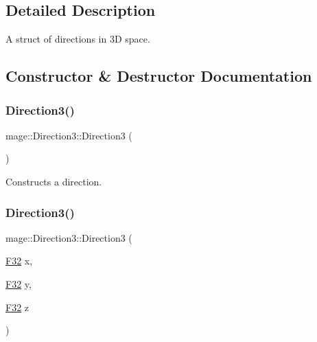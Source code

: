 \subsection{Detailed Description}
A struct of directions in 3D space. 

\subsection{Constructor \& Destructor Documentation}
\hypertarget{structmage_1_1_direction3_a1c3d06aa13b207f86df36f5f3cfe486a}{}\label{structmage_1_1_direction3_a1c3d06aa13b207f86df36f5f3cfe486a} 
\subsubsection{\texorpdfstring{Direction3()}{Direction3()}\hspace{0.1cm}{\footnotesize\ttfamily [1/8]}}
{\footnotesize\ttfamily mage\+::\+Direction3\+::\+Direction3 (\begin{DoxyParamCaption}{ }\end{DoxyParamCaption})\hspace{0.3cm}{\ttfamily [noexcept]}}

Constructs a direction. \hypertarget{structmage_1_1_direction3_a1dbabfdd974f0c2e492ae3c291bdc479}{}\label{structmage_1_1_direction3_a1dbabfdd974f0c2e492ae3c291bdc479} 
\subsubsection{\texorpdfstring{Direction3()}{Direction3()}\hspace{0.1cm}{\footnotesize\ttfamily [2/8]}}
{\footnotesize\ttfamily mage\+::\+Direction3\+::\+Direction3 (\begin{DoxyParamCaption}\item[{\hyperlink{namespacemage_aa97e833b45f06d60a0a9c4fc22ae02c0}{F32}}]{x,  }\item[{\hyperlink{namespacemage_aa97e833b45f06d60a0a9c4fc22ae02c0}{F32}}]{y,  }\item[{\hyperlink{namespacemage_aa97e833b45f06d60a0a9c4fc22ae02c0}{F32}}]{z }\end{DoxyParamCaption})\hspace{0.3cm}{\ttfamily [noexcept]}}

